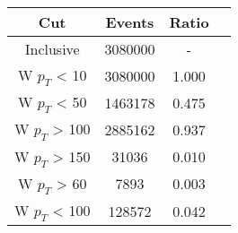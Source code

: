 \begin{tabular}{|c||c|c|c|}
\hline
Cut & Events & Ratio\\\hline
Inclusive & 3080000 & - \\
W $p_{T}$ < 10 & 3080000 & 1.000 \\
W $p_{T}$ < 50 & 1463178 & 0.475 \\
W $p_{T}$ > 100 & 2885162 & 0.937 \\
W $p_{T}$ > 150 & 31036 & 0.010 \\
W $p_{T}$ > 60 & 7893 & 0.003 \\
W $p_{T}$ < 100 & 128572 & 0.042 \\
\end{tabular}